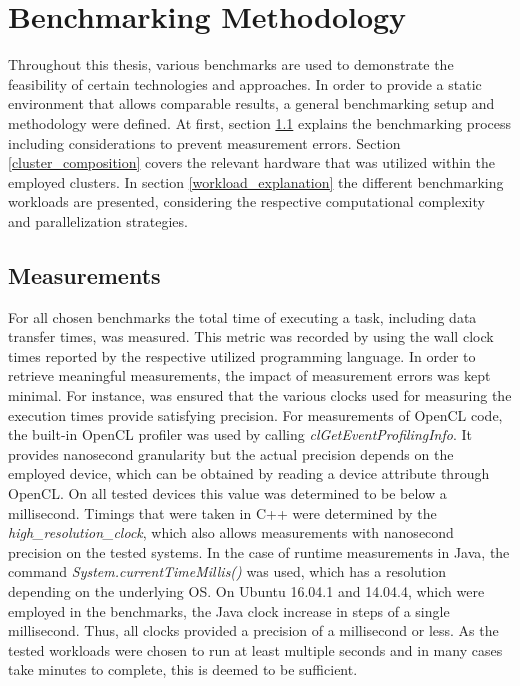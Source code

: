 \chapter{Benchmarking Methodology}
\label{benchmarking_methodology}
Throughout this thesis, various benchmarks are used to demonstrate the feasibility of certain technologies and approaches. In order to provide a static environment that allows comparable results, a general benchmarking setup and methodology were defined. At first, section \ref{measurements} explains the benchmarking process including considerations to prevent measurement errors. Section \ref{cluster_composition} covers the relevant hardware that was utilized within the employed clusters. In section \ref{workload_explanation} the different benchmarking workloads are presented, considering the respective computational complexity and parallelization strategies.

\section{Measurements}
\label{measurements}
For all chosen benchmarks the total time of executing a task, including data transfer times, was measured. This metric was recorded by using the wall clock times reported by the respective utilized programming language. In order to retrieve meaningful measurements, the impact of measurement errors was kept minimal. For instance, was ensured that the various clocks used for measuring the execution times provide satisfying precision. For measurements of OpenCL code, the built-in OpenCL profiler was used by calling \textit{clGetEventProfilingInfo}. It provides nanosecond granularity but the actual precision depends on the employed device\cite{cl_profiling}, which can be obtained by reading a device attribute through OpenCL. On all tested devices this value was determined to be below a millisecond. Timings that were taken in C++ were determined by the \textit{high\_resolution\_clock}, which also allows measurements with nanosecond precision on the tested systems. In the case of runtime measurements in Java, the command \textit{System.currentTimeMillis()} was used, which has a resolution depending on the underlying OS\cite{oracle_system}. On Ubuntu 16.04.1 and 14.04.4, which were employed in the benchmarks, the Java clock increase in steps of a single millisecond. Thus, all clocks provided a precision of a millisecond or less. As the tested workloads were chosen to run at least multiple seconds and in many cases take minutes to complete, this is deemed to be sufficient.

